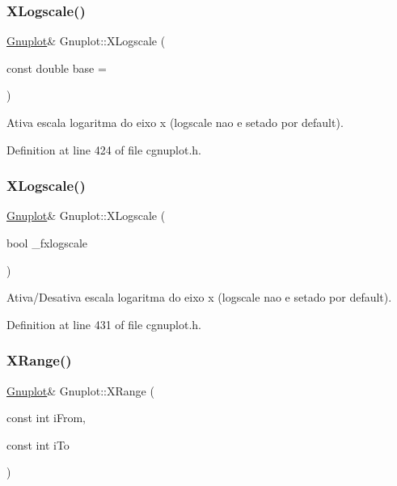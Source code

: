 \subsubsection{\texorpdfstring{X\+Logscale()}{XLogscale()}\hspace{0.1cm}{\footnotesize\ttfamily [1/2]}}
{\footnotesize\ttfamily \hyperlink{class_gnuplot}{Gnuplot}\& Gnuplot\+::\+X\+Logscale (\begin{DoxyParamCaption}\item[{const double}]{base = {} }\end{DoxyParamCaption})\hspace{0.3cm}{\ttfamily [inline]}}



Ativa escala logaritma do eixo x (logscale nao e setado por default). 



Definition at line 424 of file cgnuplot.\+h.

\mbox{\label{class_gnuplot_abf7948557e91cb8c6eb6b641e1b55543}} 
\subsubsection{\texorpdfstring{X\+Logscale()}{XLogscale()}\hspace{0.1cm}{\footnotesize\ttfamily [2/2]}}
{\footnotesize\ttfamily \hyperlink{class_gnuplot}{Gnuplot}\& Gnuplot\+::\+X\+Logscale (\begin{DoxyParamCaption}\item[{bool}]{\+\_\+fxlogscale }\end{DoxyParamCaption})\hspace{0.3cm}{\ttfamily [inline]}}



Ativa/\+Desativa escala logaritma do eixo x (logscale nao e setado por default). 



Definition at line 431 of file cgnuplot.\+h.

\mbox{\label{class_gnuplot_a3fb5c7726e954739d847edd2670705fe}} 
\subsubsection{\texorpdfstring{X\+Range()}{XRange()}}
{\footnotesize\ttfamily \hyperlink{class_gnuplot}{Gnuplot}\& Gnuplot\+::\+X\+Range (\begin{DoxyParamCaption}\item[{const int}]{i\+From,  }\item[{const int}]{i\+To }\end{DoxyParamCaption})\hspace{0.3cm}{\ttfamily [inline]}}



